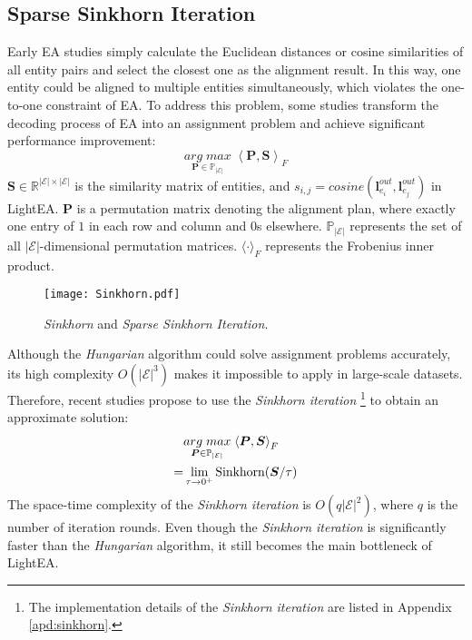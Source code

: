 \documentclass[11pt]{article}
\begin{document}
\subsection{Sparse Sinkhorn Iteration}
Early EA studies \cite{DBLP:conf/emnlp/WangLLZ18,DBLP:conf/semweb/SunHL17} simply calculate the Euclidean distances or cosine similarities of all entity pairs and select the closest one as the alignment result.
In this way, one entity could be aligned to multiple entities simultaneously, which violates the one-to-one constraint of EA.
To address this problem, some studies \cite{DBLP:conf/aaai/XuSFSY20, DBLP:conf/emnlp/MaoWWL21} transform the decoding process of EA into an assignment problem and achieve significant performance improvement:
\begin{equation}
  \underset{\bm P\in\mathbb{P}_{|\mathcal{E}|}}{arg\;max}{\;\left\langle \bm P, \bm S\right\rangle}_F
\end{equation}
$\bm S \in \mathbb{R}^{|\mathcal{E}|\times|\mathcal{E}|}$ is the similarity matrix of entities, and $s_{i,j} = cosine(\bm l^{out}_{e_i},\bm l^{out}_{e_j})$ in LightEA.
$\bm P$ is a permutation matrix denoting the alignment plan, where exactly one entry of $1$ in each row and column and $0$s elsewhere.
$\mathbb{P}_{|\mathcal{E}|}$ represents the set of all $|\mathcal{E}|$-dimensional permutation matrices.
$\langle\cdot\rangle_F$ represents the Frobenius inner product.

\begin{figure}
    \centering
    \texttt{[image: Sinkhorn.pdf]}
    \caption{\emph{Sinkhorn} and \emph{Sparse Sinkhorn Iteration}.}
    \label{fig:sink}
\end{figure}
Although the \emph{Hungarian} algorithm \cite{lawler1963quadratic} could solve assignment problems accurately, its high complexity $O(|\mathcal{E}|^3)$ makes it impossible to apply in large-scale datasets.
Therefore, recent studies \cite{DBLP:conf/sigir/GeLCZG21, DBLP:conf/emnlp/MaoWWL21} propose to use the \emph{Sinkhorn iteration} \footnote{The implementation details of the \emph{Sinkhorn iteration} are listed in Appendix \ref{apd:sinkhorn}.} \cite{DBLP:conf/nips/Cuturi13} to obtain an approximate solution:
\begin{align}
\begin{split}
  &\underset{\bm P\in\mathbb{P}_{|\mathcal{E}|}}{arg\;max}{\;\left\langle \bm P,\bm S\right\rangle}_F\\
  =& \lim_{\tau\rightarrow 0^+}{\rm Sinkhorn}(\bm S/\tau)
\end{split}
\end{align}
The space-time complexity of the \emph{Sinkhorn iteration} is $O(q|\mathcal{E}|^2)$, where $q$ is the number of iteration rounds.
Even though the \emph{Sinkhorn iteration} is significantly faster than the \emph{Hungarian} algorithm, it still becomes the main bottleneck of LightEA.
\end{document}
